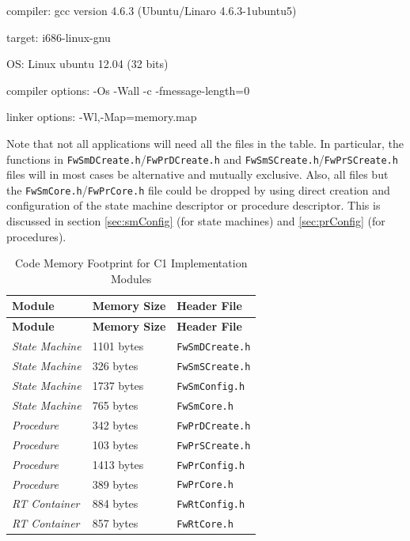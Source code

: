 \documentclass[manual]{../fwprofile}
\begin{document}
\begin{fw_itemize}
\item{compiler}: gcc version 4.6.3 (Ubuntu/Linaro 4.6.3-1ubuntu5)
\item{target}: i686-linux-gnu
\item{OS}: Linux ubuntu 12.04 (32 bits)
\item{compiler options}: -Os -Wall -c -fmessage-length=0
\item{linker options}: -Wl,-Map=memory.map
\end{fw_itemize}

Note that not all applications will need all the files in the table. In particular, the functions in \texttt{FwSmDCreate.h}/\texttt{FwPrDCreate.h} and \texttt{FwSmSCreate.h}/\texttt{FwPrSCreate.h} files will in 
most cases be alternative and mutually exclusive. Also, all files but 
the \texttt{FwSmCore.h}/\texttt{FwPrCore.h} file could be dropped by using direct creation and configuration of 
the state machine descriptor or procedure descriptor. This is discussed in section \ref{sec:smConfig} (for
state machines) and \ref{sec:prConfig} (for procedures).

\begin{longtable}{|p{2.7cm}|p{2.7cm}|p{2.7cm}|}
\caption{Code Memory Footprint for C1 Implementation Modules} \label{tab:memFootprint}\\
\rowcolor{light-gray}
\textbf{Module} & \textbf{Memory Size} & \textbf{Header File} \\
\hline\hline
\endfirsthead
\rowcolor{light-gray}
\textbf{Module} & \textbf{Memory Size} & \textbf{Header File} \\
\hline\hline
\endhead
\emph{State Machine} & 1101 bytes & \texttt{FwSmDCreate.h} \\
\hline
\emph{State Machine} & 326 bytes & \texttt{FwSmSCreate.h} \\
\hline
\emph{State Machine} & 1737 bytes & \texttt{FwSmConfig.h} \\
\hline
\emph{State Machine} & 765 bytes & \texttt{FwSmCore.h} \\
\hline
\emph{Procedure} & 342 bytes & \texttt{FwPrDCreate.h} \\
\hline
\emph{Procedure} & 103 bytes & \texttt{FwPrSCreate.h} \\
\hline
\emph{Procedure} & 1413 bytes & \texttt{FwPrConfig.h} \\
\hline
\emph{Procedure} & 389 bytes & \texttt{FwPrCore.h} \\
\hline
\emph{RT Container} & 884 bytes & \texttt{FwRtConfig.h} \\
\hline
\emph{RT Container} & 857 bytes & \texttt{FwRtCore.h} \\
\hline
\end{longtable}
\end{document}
